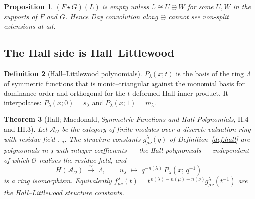 \documentclass[11pt,a4paper]{article}
\newtheorem{theorem}{Theorem}[section]
\newtheorem{proposition}[theorem]{Proposition}
\theoremstyle{definition}
\newtheorem{definition}[theorem]{Definition}
\theoremstyle{remark}
\newcommand{\FF}{\mathbb{F}}
\begin{document}
\begin{proposition}\label{prop:daymisses}
$(F \star G)(L)$ is empty unless $L \cong U \oplus W$ for some $U, W$ in the
supports of $F$ and $G$. Hence Day convolution along $\oplus$ cannot see
non-split extensions at all.
\end{proposition}

\begin{center}
\end{center}

\subsection{The Hall side is Hall--Littlewood}

\begin{definition}[Hall--Littlewood polynomials]
$P_\lambda(x;t)$ is the basis of the ring $\Lambda$ of symmetric functions that is
monic--triangular against the monomial basis for dominance order and orthogonal
for the $t$-deformed Hall inner product. It interpolates: $P_\lambda(x;0) =
s_\lambda$ and $P_\lambda(x;1) = m_\lambda$.
\end{definition}

\begin{theorem}[Hall; Macdonald, \emph{Symmetric Functions and Hall Polynomials},
II.4 and III.3]\label{thm:HL}
Let $\mathcal{A}_{\mathcal{O}}$ be the category of finite modules over a discrete
valuation ring with residue field $\FF_q$. The structure constants
$g^{\lambda}_{\mu\nu}(q)$ of Definition~\ref{def:hall} are polynomials in $q$ with
integer coefficients --- the \emph{Hall polynomials} --- independent of which
$\mathcal{O}$ realises the residue field, and
\[
  H(\mathcal{A}_{\mathcal{O}}) \;\xrightarrow{\ \sim\ }\; \Lambda,
  \qquad
  u_\lambda \;\longmapsto\; q^{-n(\lambda)}\,P_\lambda\!\left(x;\,q^{-1}\right)
\]
is a ring isomorphism. Equivalently
$f^{\lambda}_{\mu\nu}(t) = t^{\,n(\lambda)-n(\mu)-n(\nu)} g^{\lambda}_{\mu\nu}(t^{-1})$
are the Hall--Littlewood structure constants.
\end{theorem}
\end{document}
